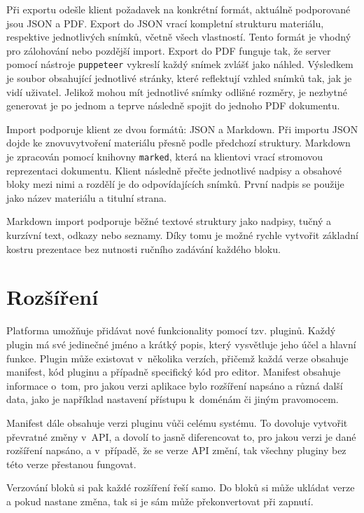 Při exportu odešle klient požadavek na konkrétní formát, aktuálně podporované jsou JSON a PDF. 
Export do JSON vrací kompletní strukturu materiálu, respektive jednotlivých snímků, včetně všech vlastností. 
Tento formát je vhodný pro zálohování nebo pozdější import. 
Export do PDF funguje tak, že server pomocí nástroje \texttt{puppeteer} vykreslí každý snímek zvlášť jako náhled. 
Výsledkem je soubor obsahující jednotlivé stránky, které reflektují vzhled snímků tak, jak je vidí uživatel.
Jelikož mohou mít jednotlivé snímky odlišné rozměry, je nezbytné generovat je po jednom a teprve následně spojit do jednoho PDF dokumentu.

Import podporuje klient ze dvou formátů: JSON a Markdown. 
Při importu JSON dojde ke znovuvytvoření materiálu přesně podle předchozí struktury. 
Markdown je zpracován pomocí knihovny \texttt{marked}, která na klientovi vrací stromovou reprezentaci dokumentu. 
Klient následně přečte jednotlivé nadpisy a obsahové bloky mezi nimi a rozdělí je do odpovídajících snímků. 
První nadpis se použije jako název materiálu a titulní strana.

Markdown import podporuje běžné textové struktury jako nadpisy, tučný a kurzívní text, odkazy nebo seznamy. 
Díky tomu je možné rychle vytvořit základní kostru prezentace bez nutnosti ručního zadávání každého bloku.

\section{Rozšíření}

Platforma umožňuje přidávat nové funkcionality pomocí tzv. pluginů. 
Každý plugin má své jedinečné jméno a krátký popis, který vysvětluje jeho účel a hlavní funkce. 
Plugin může existovat v~několika verzích, přičemž každá verze obsahuje manifest, kód pluginu a případně specifický kód pro editor.
Manifest obsahuje informace o~tom, pro jakou verzi aplikace bylo rozšíření napsáno a různá další data, jako je například nastavení přístupu k~doménám či jiným pravomocem.

Manifest dále obsahuje verzi pluginu vůči celému systému.
To dovoluje vytvořit převratné změny v~API, a dovolí to jasně diferencovat to, pro jakou verzi je dané rozšíření napsáno, a v~případě, že se verze API změní, tak všechny pluginy bez této verze přestanou fungovat.

Verzování bloků si pak každé rozšíření řeší samo.
Do bloků si může ukládat verze a pokud nastane změna, tak si je sám může překonvertovat při zapnutí.

